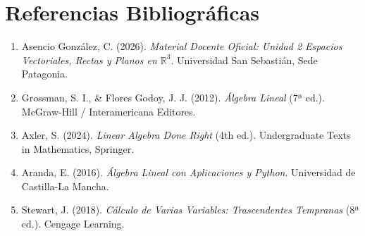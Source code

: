 \documentclass[10pt,letterpaper]{article}
\begin{document}
\section{Referencias Bibliográficas}
\begin{enumerate}
    \item Asencio González, C. (2026). \textit{Material Docente Oficial: Unidad 2 Espacios Vectoriales, Rectas y Planos en $\mathbb{R}^3$}. Universidad San Sebastián, Sede Patagonia.
    \item Grossman, S. I., \& Flores Godoy, J. J. (2012). \textit{Álgebra Lineal} (7ª ed.). McGraw-Hill / Interamericana Editores.
    \item Axler, S. (2024). \textit{Linear Algebra Done Right} (4th ed.). Undergraduate Texts in Mathematics, Springer.
    \item Aranda, E. (2016). \textit{Álgebra Lineal con Aplicaciones y Python}. Universidad de Castilla-La Mancha.
    \item Stewart, J. (2018). \textit{Cálculo de Varias Variables: Trascendentes Tempranas} (8ª ed.). Cengage Learning.
\end{enumerate}
\end{document}
